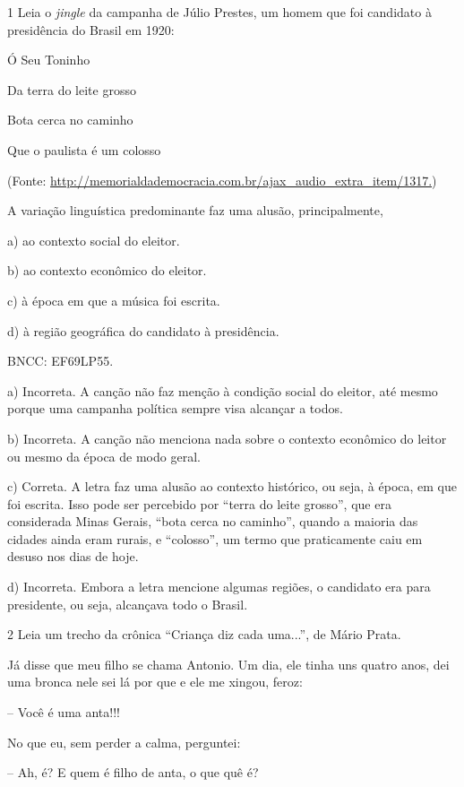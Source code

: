 {



\num{1} Leia o \emph{jingle} da campanha de Júlio Prestes, um homem que
foi candidato à presidência do Brasil em 1920:

Ó Seu Toninho

Da terra do leite grosso

Bota cerca no caminho

Que o paulista é um colosso

(Fonte:
\url{http://memorialdademocracia.com.br/ajax_audio_extra_item/1317.})

A variação linguística predominante faz uma alusão, principalmente,

a) ao contexto social do eleitor.

b) ao contexto econômico do eleitor.

c) à época em que a música foi escrita.

d) à região geográfica do candidato à presidência.

BNCC: EF69LP55.

a) Incorreta. A canção não faz menção à condição social do eleitor, até
mesmo porque uma campanha política sempre visa alcançar a todos.

b) Incorreta. A canção não menciona nada sobre o contexto econômico do
leitor ou mesmo da época de modo geral.

c) Correta. A letra faz uma alusão ao contexto histórico, ou seja, à
época, em que foi escrita. Isso pode ser percebido por ``terra do leite
grosso'', que era considerada Minas Gerais, ``bota cerca no caminho'',
quando a maioria das cidades ainda eram rurais, e ``colosso'', um termo
que praticamente caiu em desuso nos dias de hoje.

d) Incorreta. Embora a letra mencione algumas regiões, o candidato era
para presidente, ou seja, alcançava todo o Brasil.

\num{2} Leia um trecho da crônica ``Criança diz cada uma...'', de Mário
Prata.

Já disse que meu filho se chama Antonio. Um dia, ele tinha uns quatro
anos, dei uma bronca nele sei lá por que e ele me xingou, feroz:

-- Você é uma anta!!!

No que eu, sem perder a calma, perguntei:

-- Ah, é? E quem é filho de anta, o que quê é?

}

